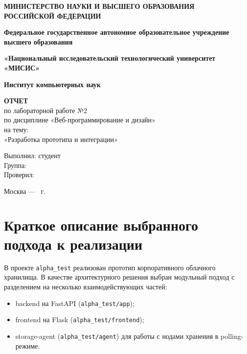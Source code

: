 \documentclass[14pt,a4paper]{extarticle}
\begin{document}
\begin{titlepage}
    \begin{center}
        \textbf{МИНИСТЕРСТВО НАУКИ И ВЫСШЕГО ОБРАЗОВАНИЯ}\\
        \textbf{РОССИЙСКОЙ ФЕДЕРАЦИИ}

        \vspace{1cm}
        \textbf{Федеральное государственное автономное образовательное учреждение}\\
        \textbf{высшего образования}

        \vspace{0.5cm}
        \textbf{«Национальный исследовательский технологический университет «МИСИС»}

        \vspace{1cm}
        \textbf{Институт компьютерных наук}

        \vfill

        \textbf{ОТЧЕТ}\\
        по лабораторной работе №2\\
        по дисциплине «Веб-программирование и дизайн»\\
        на тему:\\
        «Разработка прототипа и интеграции»
    \end{center}

    \vfill

    \begin{flushright}
        Выполнил: студент \underline{\hspace{5cm}}\\
        Группа: \underline{\hspace{4.5cm}}\\
        Проверил: \underline{\hspace{4.8cm}}
    \end{flushright}

    \vfill

    \begin{center}
        Москва --- \the\year\ г.
    \end{center}
\end{titlepage}

\setcounter{page}{2}

\tableofcontents
\newpage

\section{Краткое описание выбранного подхода к реализации}
В проекте \texttt{alpha\_test} реализован прототип корпоративного облачного хранилища.
В качестве архитектурного решения выбран модульный подход с разделением на несколько взаимодействующих частей:
\begin{itemize}
    \item backend на FastAPI (\texttt{alpha\_test/app});
    \item frontend на Flask (\texttt{alpha\_test/frontend});
    \item storage-agent (\texttt{alpha\_test/agent}) для работы с нодами хранения в polling-режиме.
\end{itemize}
\end{document}
